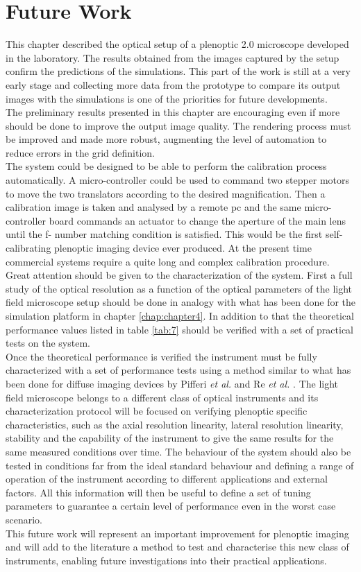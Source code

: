 \section{Future Work}
This chapter described the optical setup of a plenoptic 2.0 microscope developed in the laboratory. The results obtained from the images captured by the setup confirm the predictions of the simulations. This part of the work is still at a very early stage and collecting more data from the prototype to compare its output images with the simulations is one of the priorities for future developments.\\
 The preliminary results presented in this chapter are encouraging even if more should be done to improve the output image quality. The rendering process must be improved and made more robust, augmenting the level of automation to reduce errors in the grid definition. 
 \\
 The system could be designed to be able to perform the calibration process automatically. A micro-controller could be used to command two stepper motors to move the two translators according to the desired magnification. Then a calibration image is taken and analysed by a remote pc and the same micro-controller board commands an actuator to change the aperture of the main lens until the f- number matching condition is satisfied. This would be the first self-calibrating plenoptic imaging device ever produced. At the present time commercial systems require a quite long and complex calibration procedure.\\
 Great attention should be given to the characterization of the system. First a full study of the optical resolution as a function of the optical parameters of the light field microscope setup should be done in analogy with what has been done for the simulation platform in chapter \ref{chap:chapter4}. In addition to that the theoretical performance values listed in table \ref{tab:7} should be verified with a set of practical tests on the system. 
\\
 Once the theoretical performance is verified the instrument must be fully characterized with a set of performance tests using a method similar to what has been done for diffuse imaging devices by Pifferi \textit{et al.} \cite{pifferi2005performance} and Re \textit{et al.} \cite{re2013multi}. The light field microscope belongs to a different class of optical instruments and its characterization protocol will be focused on verifying plenoptic specific characteristics, such as the axial resolution linearity, lateral resolution linearity, stability and the capability of the instrument to give the same results for the same measured conditions over time. The behaviour of the system should also be tested in conditions far from the ideal standard behaviour and defining a range of operation of the instrument according to different applications and external factors. All this information will then be useful to define a set of tuning parameters to guarantee a certain level of performance even in the worst case scenario.
 \\
 This future work will represent an important improvement for plenoptic imaging and will add to the literature a method to test and characterise this new class of instruments, enabling future investigations into their practical applications.
 
